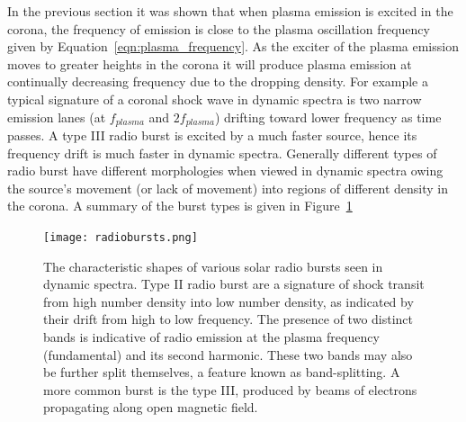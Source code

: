 In the previous section it was shown that when plasma emission is excited in the corona, the frequency of emission is close to the plasma oscillation frequency given by Equation~\ref{eqn:plasma_frequency}.
As the exciter of the plasma emission moves to greater heights in the corona it will produce plasma emission at continually decreasing frequency due to the dropping density. For example a typical signature of a coronal shock wave in dynamic spectra is two narrow emission lanes (at $f_{plasma}$ and $2f_{plasma}$) drifting toward lower frequency as time passes. A type III radio burst is excited by a much faster source, hence its frequency drift is much faster in dynamic spectra. Generally different types of radio burst have different morphologies when viewed in dynamic spectra owing the source's movement (or lack of movement) into regions of different density in the corona. A summary of the burst types is given in Figure~\ref{fig:radiobursts}
\begin{figure}[t!]
\begin{center}
\texttt{[image: radiobursts.png]}
\caption[Solar radio burst morphologies]{The characteristic shapes of various solar radio bursts seen in dynamic spectra. Type II radio burst are a signature of shock transit from high number density into low number density, as indicated by their drift from high to low frequency. The presence of two distinct bands is indicative of radio emission at the plasma frequency (fundamental) and its second harmonic. These two bands may also be further split themselves, a feature known as band-splitting. A more common burst is the type III, produced by beams of electrons propagating along open magnetic field.}
\label{fig:radiobursts}
\end{center}
\end{figure}

